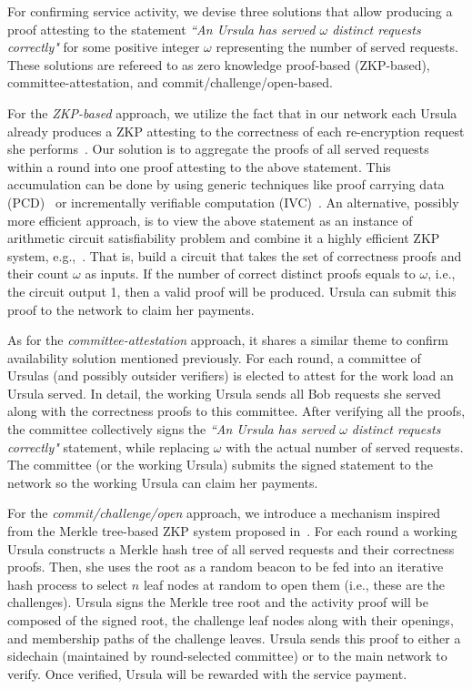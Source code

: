 For confirming service activity, we devise three solutions that allow producing a proof attesting to the statement \emph{``An Ursula has served $\omega$ distinct requests correctly"} for some positive integer $\omega$ representing the number of served requests. These solutions are refereed to as zero knowledge proof-based (ZKP-based), committee-attestation, and commit/challenge/open-based. 


For the \emph{ZKP-based} approach, we utilize the fact that in our network each Ursula already produces a ZKP attesting to the correctness of each re-encryption request she performs~\cite{umbral2018}. Our solution is to aggregate the proofs of all served requests within a round into one proof attesting to the above statement. This accumulation can be done by using generic techniques like proof carrying data (PCD)~\cite{chiesa2010proof} or incrementally verifiable computation (IVC)~\cite{valiant08}. An alternative, possibly more efficient approach, is to view the above statement as an instance of arithmetic circuit satisfiability problem and combine it a highly efficient ZKP system, e.g.,~\cite{bunz18}. That is, build a circuit that takes the set of correctness proofs and their count $\omega$ as inputs. If the number of correct distinct proofs equals to $\omega$, i.e., the circuit output 1,  then a valid proof will be produced. Ursula can submit this proof to the network to claim her payments. 


As for the \emph{committee-attestation} approach, it shares a similar theme to confirm availability solution mentioned previously. For each round, a committee of Ursulas (and possibly outsider verifiers) is elected to attest for the work load an Ursula served. In detail, the working Ursula sends all Bob requests she served along with the correctness proofs to this committee. After verifying all the proofs, the committee collectively signs the \emph{``An Ursula has served $\omega$ distinct requests correctly"} statement, while replacing $\omega$ with the actual number of served requests. The committee (or the working Ursula) submits the signed statement to the network so the working Ursula can claim her payments.


For the \emph{commit/challenge/open} approach, we introduce a mechanism inspired from the Merkle tree-based ZKP system proposed in~\cite{dottling19}. For each round a working Ursula constructs a Merkle hash tree of all served requests and their correctness proofs. Then, she uses the root as a random beacon to be fed into an iterative hash process to select $n$ leaf nodes at random to open them (i.e., these are the challenges). Ursula signs the Merkle tree root and the activity proof will be composed of the signed root, the challenge leaf nodes along with their openings, and membership paths of the challenge leaves. Ursula sends this proof to either a sidechain (maintained by round-selected committee) or to the main network to verify. Once verified, Ursula will be rewarded with the service payment.


